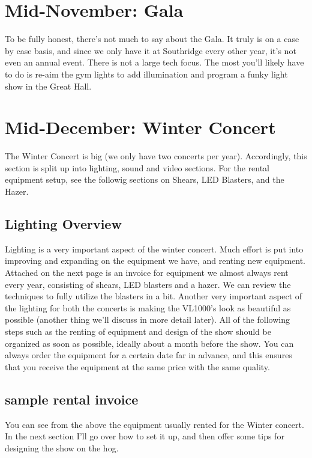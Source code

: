 \documentclass[letterpaper,10pt,oneside,headsepline]{scrreprt}
\begin{document}
\section{Mid-November: Gala}
To be fully honest, there's not much to say about the Gala. It truly is on a case by case basis, and since we only have it at Southridge every other year, it's not even an annual event. There is not a large tech focus. The most you'll likely have to do is re-aim the gym lights to add illumination and program a funky light show in the Great Hall.
\section{Mid-December: Winter Concert}
The Winter Concert is big (we only have two concerts per year). Accordingly, this section is split up into lighting, sound and video sections. For the rental equipment setup, see the followig sections on Shears, LED Blasters, and the Hazer. 
\subsection{Lighting Overview}
Lighting is a very important aspect of the winter concert. Much effort is put into improving and expanding on the equipment we have, and renting new equipment. Attached on the next page is an invoice for equipment we almost always rent every year, consisting of shears, LED blasters and a hazer. We can review the techniques to fully utilize the blasters in a bit. Another very important aspect of the lighting for both the concerts is making the VL1000's look as beautiful as possible (another thing we'll discuss in more detail later). All of the following steps such as the renting of equipment and design of the show should be organized as soon as possible, ideally about a month before the show. You can always order the equipment for a certain date far in advance, and this ensures that you receive the equipment at the same price with the same quality.

\subsection{sample rental invoice}
%

You can see from the above the equipment usually rented for the Winter concert. In the next section I'll go over how to set it up, and then offer some tips for designing the show on the hog.
\end{document}
